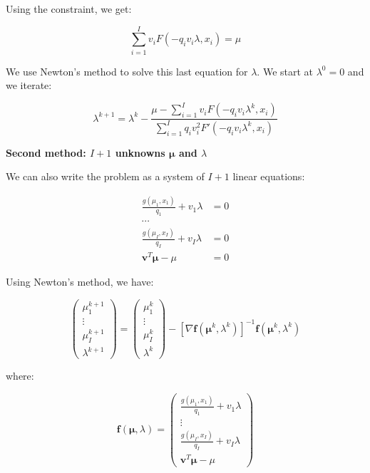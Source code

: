 \documentclass{tex/note}
\begin{document}
Using the constraint, we get:

\begin{equation*}
\sum_{i = 1}^I v_i F \left( - q_i v_i \lambda , x_i \right) = \mu
\end{equation*}

We use Newton's method to solve this last equation for $\lambda$. We start at $\lambda^0 = 0$ and we iterate:

\begin{equation*}
\lambda^{k + 1} = \lambda^k - \frac{\mu - \sum_{i = 1}^I v_i F \left( - q_i v_i \lambda^k , x_i \right)}{\sum_{i = 1}^I q_i v_i^2 F' \left( - q_i v_i \lambda^k , x_i \right)}
\end{equation*}

\textbf{Second method: $I + 1$ unknowns $\bm{\mu}$ and $\lambda$}

We can also write the problem as a system of $I + 1$ linear equations:

\begin{align*}
\frac{g \left( \mu_1 , x_1 \right)}{q_1} + v_1 \lambda &= 0 \\
\cdots & \\
\frac{g \left( \mu_I , x_I \right)}{q_I} + v_I \lambda &= 0 \\
\bm{v}^T \bm{\mu} - \mu &= 0
\end{align*}

Using Newton's method, we have:

\begin{equation*}
\begin{pmatrix} \mu_1^{k + 1} \\ \vdots \\ \mu_I^{k + 1} \\ \lambda^{k + 1} \end{pmatrix} = \begin{pmatrix} \mu_1^k \\ \vdots \\ \mu_I^k \\ \lambda^k \end{pmatrix} - \left[ \nabla \bm{f} \left( \bm{\mu}^k , \lambda^k \right) \right] ^{-1} \bm{f} \left( \bm{\mu}^k , \lambda^k \right)
\end{equation*}

where:

\begin{equation*}
\bm{f} \left( \bm{\mu} , \lambda \right) = \begin{pmatrix} \frac{g \left( \mu_1 , x_1 \right)}{q_1} + v_1 \lambda \\ \vdots \\ \frac{g \left( \mu_I, x_I \right)}{q_I} + v_I \lambda \\ \bm{v}^T \bm{\mu} - \mu \end{pmatrix}
\end{equation*}
\end{document}
